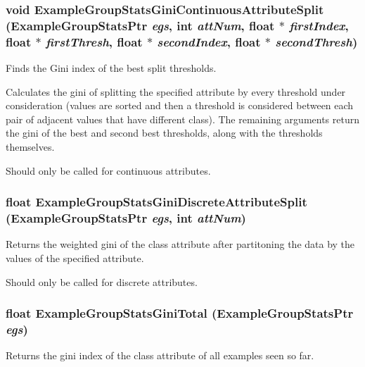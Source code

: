 \subsubsection{\setlength{\rightskip}{0pt plus 5cm}void Example\-Group\-Stats\-Gini\-Continuous\-Attribute\-Split ({\bf Example\-Group\-Stats\-Ptr} {\em egs}, int {\em att\-Num}, float $\ast$ {\em first\-Index}, float $\ast$ {\em first\-Thresh}, float $\ast$ {\em second\-Index}, float $\ast$ {\em second\-Thresh})}\label{ExampleGroupStats_8h_a49}


Finds the Gini index of the best split thresholds. 

Calculates the gini of splitting the specified attribute by every threshold under consideration (values are sorted and then a threshold is considered between each pair of adjacent values that have different class). The remaining arguments return the gini of the best and second best thresholds, along with the thresholds themselves.

Should only be called for continuous attributes. 
\subsubsection{\setlength{\rightskip}{0pt plus 5cm}float Example\-Group\-Stats\-Gini\-Discrete\-Attribute\-Split ({\bf Example\-Group\-Stats\-Ptr} {\em egs}, int {\em att\-Num})}\label{ExampleGroupStats_8h_a48}


Returns the weighted gini of the class attribute after partitoning the data by the values of the specified attribute. 

Should only be called for discrete attributes. 
\subsubsection{\setlength{\rightskip}{0pt plus 5cm}float Example\-Group\-Stats\-Gini\-Total ({\bf Example\-Group\-Stats\-Ptr} {\em egs})}\label{ExampleGroupStats_8h_a47}


Returns the gini index of the class attribute of all examples seen so far. 

